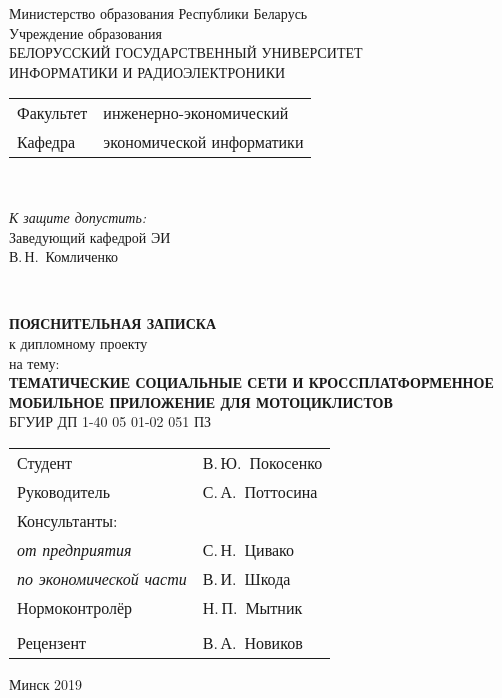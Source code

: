 \begin{titlepage}
  \begin{center}
    Министерство образования Республики Беларусь\\[1em]
    Учреждение образования\\
    БЕЛОРУССКИЙ ГОСУДАРСТВЕННЫЙ УНИВЕРСИТЕТ \\
    ИНФОРМАТИКИ И РАДИОЭЛЕКТРОНИКИ\\[1em]

    \begin{minipage}{\textwidth}
      \begin{flushleft}
        \begin{tabular}{ l l }
          Факультет & инженерно-экономический\\
          Кафедра   & экономической информатики
        \end{tabular}
      \end{flushleft}
    \end{minipage}\\[1em]

    \begin{flushright}
      \begin{minipage}{0.4\textwidth}
        \textit{К защите допустить:}\\[0.8em]
        Заведующий кафедрой ЭИ\\[0.45em]
        \underline{\hspace*{2.6cm}} В.\,Н.~Комличенко
      \end{minipage}\\[2.2em]
    \end{flushright}

    \textbf{ПОЯСНИТЕЛЬНАЯ ЗАПИСКА}\\
    {к дипломному проекту}\\
    {на тему:}\\[1em]
    \textbf{\large ТЕМАТИЧЕСКИЕ СОЦИАЛЬНЫЕ СЕТИ И КРОССПЛАТФОРМЕННОЕ МОБИЛЬНОЕ ПРИЛОЖЕНИЕ ДЛЯ МОТОЦИКЛИСТОВ}\\[1em]


    {БГУИР ДП 1-40 05 01-02 051 ПЗ}\\[2em]
    
    \begin{tabular}{ p{}p{} }
      Студент & В.\,Ю.~Покосенко \\
      Руководитель & С.\,А.~Поттосина \\
      Консультанты: &\\
      \hspace*{3ex}\emph{от предприятия} & С.\,Н.~Цивако \\
      \hspace*{3ex}\emph{по экономической части} & В.\,И.~Шкода \\
      Нормоконтролёр & Н.\,П.~Мытник\\
      & \\
      Рецензент & В.\,А.~Новиков 
    \end{tabular}
    
    \vfill
    {\normalsize Минск 2019}
  \end{center}
\end{titlepage}
